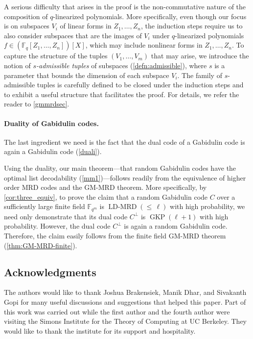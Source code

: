\documentclass[11pt]{article}
\theoremstyle{plain}
\theoremstyle{definition}
\theoremstyle{remark}
\newcommand{\ldmrd}[1]{\operatorname{LD-MRD}({\leq}\,#1)}
\newcommand{\F}{\mathbb{F}}
\begin{document}
A serious difficulty that arises in the proof is the non-commutative nature of the composition of $q$-linearized polynomials. More specifically, even though our focus is on subspaces $V_i$ of linear forms in $Z_1,\dots,Z_n$, the induction steps require us to also consider subspaces that are the images of $V_i$ under $q$-linearized polynomials $f\in(\F_q[Z_1,\dots,Z_n])[X]$, which may include nonlinear forms in $Z_1,\dots,Z_n$. To capture the structure of the tuples $(V_1,\dots,V_m)$ that may arise, we introduce the notion of \emph{$s$-admissible tuples} of subspaces (\cref{defn:admissible}), where $s$ is a parameter that bounds the dimension of each subspace $V_i$. The family of $s$-admissible tuples is carefully defined to be closed under the induction steps and to exhibit a useful structure that facilitates the proof. For details, we refer the reader to \cref{gmmrdsec}.

\paragraph{Duality of Gabidulin codes.}

The last ingredient we need is the fact that the dual code of a Gabidulin code is again a Gabidulin code (\cref{duali}).

Using the duality, our main theorem---that random Gabidulin codes have the optimal list decodability (\cref{mm1})---follows readily from the equivalence of higher order MRD codes and the GM-MRD theorem.
More specifically, by \cref{cor:three_equiv}, to prove the claim that a random Gabidulin code $C$ over a sufficiently large finite field $\F_{q^m}$ is $\ldmrd{\ell}$ with high probability, we need only demonstrate that its dual code $C^\perp$ is $\operatorname{GKP}(\ell+1)$ with high probability. However, the dual code $C^\perp$ is again a random Gabidulin code. Therefore, the claim easily follows from the finite field GM-MRD theorem (\cref{thm:GM-MRD-finite}).

\iffalse

\subsection*{Acknowledgments} 
The authors would like to thank Joshua Brakensiek, Manik Dhar, and Sivakanth Gopi for many useful discussions and suggestions that helped this paper. Part of this work was carried out while the first author and the fourth author were visiting the Simons Institute for the Theory of Computing at UC Berkeley. They would like to thank the institute for its support and hospitality.
\end{document}
